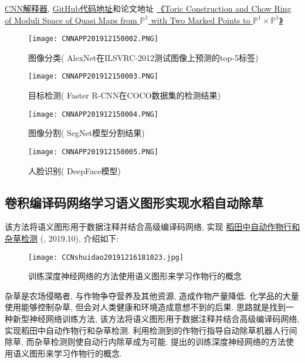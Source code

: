 \href{https://poloclub.github.io/cnn-explainer/}{CNN解释器}, \href{https://github.com/poloclub/cnn-explainer}{GitHub代码地址}和论文地址
\href{https://arxiv.org/abs/2004.1500}{《Toric Construction and Chow Ring of Moduli Space of Quasi Maps from $\mathbb P^1$ with Two Marked Points to $\mathbb P^1\times \mathbb P^1$》}
\begin{figure}[H]
    \centering
    \texttt{[image: CNNAPP201912150002.PNG]}
    \caption{图像分类( AlexNet在ILSVRC-2012测试图像上预测的top-5标签)}
    \label{CNNAPP201912150002}
    \vspace{-0.4cm}
\end{figure}
\begin{figure}[H]
    \centering
    \texttt{[image: CNNAPP201912150003.PNG]}
    \caption{目标检测( Faster R-CNN在COCO数据集的检测结果)}
    \label{CNNAPP201912150003}
    \vspace{-0.4cm}
\end{figure}
\begin{figure}[H]
    \centering
    \texttt{[image: CNNAPP201912150004.PNG]}
    \caption{图像分割( SegNet模型分割结果)}
    \label{CNNAPP201912150004}
    \vspace{-0.4cm}
\end{figure}
\begin{figure}[H]
    \centering
    \texttt{[image: CNNAPP201912150005.PNG]}
    \caption{人脸识别( DeepFace模型)}
    \label{CNNAPP201912150005}
    \vspace{-0.4cm}
\end{figure}
\subsection{卷积编译码网络学习语义图形实现水稻自动除草}
该方法将语义图形用于数据注释并结合高级编译码网络, 实现 \href{https://doi.org/10.3389/fpls.2019.01404}{稻田中自动作物行和杂草检测} (\cite{Adhikari-2019}, 2019.10), 介绍如下:
\begin{figure}[H]
    \centering
    \texttt{[image: CCNshuidao20191216181023.jpg]}
    \caption{训练深度神经网络的方法使用语义图形来学习作物行的概念}
    \label{CCNshuidao20191216181023}
    \vspace{-0.4cm}
\end{figure}
杂草是农场侵略者, 与作物争夺营养及其他资源, 造成作物产量降低. 化学品的大量使用能够控制杂草, 但会对人类健康和环境造成意想不到的后果.
思路就是找到一种新型神经网络训练方法, 该方法将语义图形用于数据注释并结合高级编译码网络, 实现稻田中自动作物行和杂草检测.
利用检测到的作物行指导自动除草机器人行间除草, 而杂草检测则使自动行内除草成为可能. 提出的训练深度神经网络的方法使用语义图形来学习作物行的概念.

